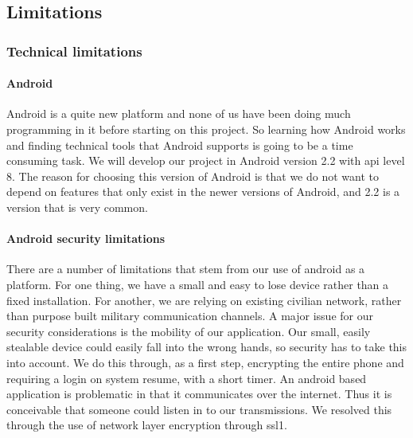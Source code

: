 \subsection{Limitations}

\subsubsection{Technical limitations}

\paragraph{Android}\hfill
\newline
Android is a quite new platform and none of us have been doing much programming in it before starting on this project. So learning how Android works and finding technical tools that Android supports is going to be a time consuming task. We will develop our project in Android version 2.2 with \gls{api} level 8. The reason for choosing this version of Android is that we do not want to depend on features that only exist in the newer versions of Android, and 2.2 is a version that is very common.

\newpage

\paragraph{Android security limitations}\hfill
\newline
There are a number of limitations that stem from our use of android as a platform. For one thing, we have a small and easy to lose device rather than a fixed installation. For another, we are relying on existing civilian network, rather than purpose built military communication channels.
\newline
\newline
A major issue for our security considerations is the mobility of our application. Our small, easily stealable device could easily fall into the wrong hands, so security has to take this into account. We do this through, as a first step, encrypting the entire phone and requiring a login on system resume, with a short timer.
\newline
\newline
An android based application is problematic in that it communicates over the internet. Thus it is conceivable that someone could listen in to our transmissions. We resolved this through the use of network layer encryption through \gls{ssl1}. 

